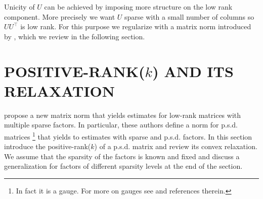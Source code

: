 \documentclass[letterpaper]{article}
\begin{document}



Unicity of $U$ can be achieved by imposing more structure on the low rank component. More precisely we want $U$ sparse with a small number of columns so $UU^{\top}$ is low rank. For this purpose we regularize with a matrix norm  introduced by \citet{richard2014tight}, which we review in the following
section.

 


%


\section{POSITIVE-RANK($k$) AND ITS RELAXATION}


\citet{richard2014tight} propose a new matrix norm that yields estimates for low-rank matrices with multiple sparse factors. In particular, these authors define a norm for p.s.d. matrices \footnote{In fact it is a gauge. For more on gauges see \citet{chandrasekaran2012convex} and references therein.}  that yields to estimates with sparse and p.s.d. factors. In this section introduce the positive-rank($k$) of a p.s.d. matrix and review its convex relaxation. We assume that the sparsity of the factors is known and fixed and discuss a generalization for factors of different sparsity levels at the end of the section.
\end{document}
